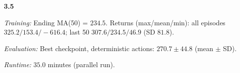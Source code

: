 \noindent\textbf{3.5}\par
\emph{Training:} Ending MA(50) = $234.5$. Returns (max/mean/min): all episodes $325.2/153.4/-616.4$; last 50 $307.6/234.5/46.9$ (SD $81.8$).\par
\emph{Evaluation:} Best checkpoint, deterministic actions: $270.7\pm 44.8$ (mean $\pm$ SD).\par
\emph{Runtime:} $35.0$ minutes (parallel run).\par
